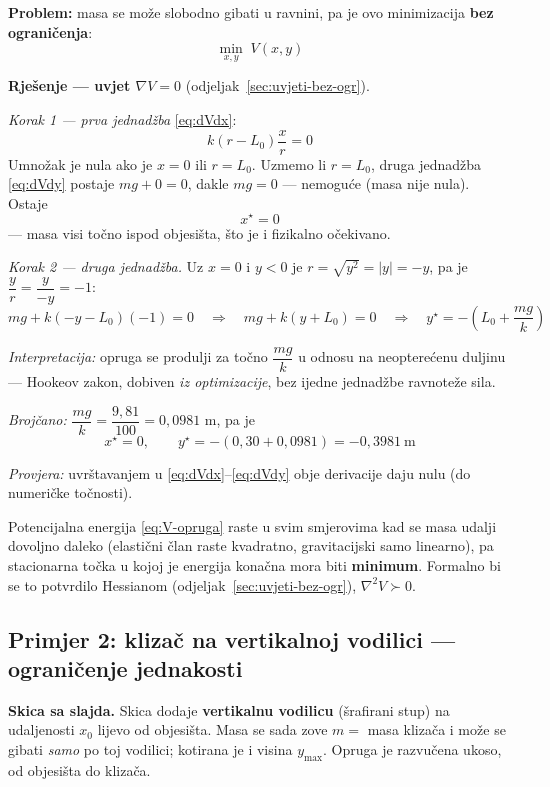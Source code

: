 \textbf{Problem:} masa se može slobodno gibati u ravnini, pa je ovo
minimizacija \textbf{bez ograničenja}:
\[
\min_{x,y}\; V(x,y)
\]

\textbf{Rješenje --- uvjet $\nabla V = 0$} (odjeljak~\ref{sec:uvjeti-bez-ogr}).

\emph{Korak 1 --- prva jednadžba} \eqref{eq:dVdx}:
\[
k(r - L_0)\frac{x}{r} = 0
\]
Umnožak je nula ako je $x = 0$ ili $r = L_0$. Uzmemo li $r = L_0$, druga
jednadžba \eqref{eq:dVdy} postaje $mg + 0 = 0$, dakle $mg = 0$ --- nemoguće
(masa nije nula). Ostaje
\[
\boxed{x^\star = 0}
\]
--- masa visi točno ispod objesišta, što je i fizikalno očekivano.

\emph{Korak 2 --- druga jednadžba.} Uz $x = 0$ i $y < 0$ je
$r = \sqrt{y^2} = |y| = -y$, pa je $\dfrac{y}{r} = \dfrac{y}{-y} = -1$:
\[
mg + k(-y - L_0)(-1) = 0
\quad\Longrightarrow\quad
mg + k(y + L_0) = 0
\quad\Longrightarrow\quad
\boxed{y^\star = -\left(L_0 + \frac{mg}{k}\right)}
\]

\emph{Interpretacija:} opruga se produlji za točno $\dfrac{mg}{k}$ u odnosu na
neopterećenu duljinu --- Hookeov zakon, dobiven \emph{iz optimizacije}, bez
ijedne jednadžbe ravnoteže sila.

\emph{Brojčano:} $\dfrac{mg}{k} = \dfrac{9{,}81}{100} = 0{,}0981$ m, pa je
\[
x^\star = 0, \qquad y^\star = -(0{,}30 + 0{,}0981) = -0{,}3981\ \text{m}
\]

\emph{Provjera:} uvrštavanjem u \eqref{eq:dVdx}--\eqref{eq:dVdy} obje
derivacije daju nulu (do numeričke točnosti). \checkmark

\begin{napomena}
Potencijalna energija \eqref{eq:V-opruga} raste u svim smjerovima kad se masa
udalji dovoljno daleko (elastični član raste kvadratno, gravitacijski samo
linearno), pa stacionarna točka u kojoj je energija konačna mora biti
\textbf{minimum}. Formalno bi se to potvrdilo Hessianom
(odjeljak~\ref{sec:uvjeti-bez-ogr}), $\nabla^2V \succ 0$.
\end{napomena}

\subsection{Primjer 2: klizač na vertikalnoj vodilici --- ograničenje jednakosti}

\textbf{Skica sa slajda.} Skica dodaje \textbf{vertikalnu vodilicu} (šrafirani
stup) na udaljenosti $x_0$ lijevo od objesišta. Masa se sada zove
$m = $ masa klizača i može se gibati \emph{samo} po toj vodilici; kotirana je
i visina $y_{\max}$. Opruga je razvučena ukoso, od objesišta do klizača.

